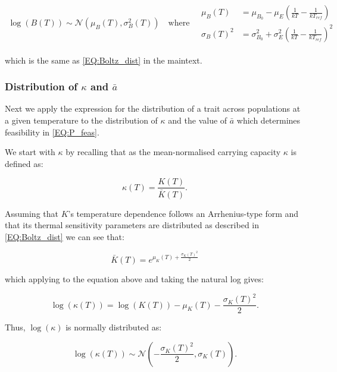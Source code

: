 \documentclass{article}
\begin{document}
\begin{align*} 
    \log(B(T)) \sim \mathcal{N}\left(\mu_{B}(T) , \sigma_{B}^2(T) \right) 
    \quad \text{where} \quad
    \begin{array}{cc}
        \mu_B(T) &= \mu_{B_0} - \mu_{E} \left(\frac{1}{kT} - \frac{1}{k T_{ref} }\right)  \\
        \sigma_{B}(T)^2 &= \sigma_{B_0}^2 + \sigma_{E}^2 \left(\frac{1}{kT} - \frac{1}{k T_{ref} }\right)^2
    \end{array}
\end{align*}

which is the same as \cref{EQ:Boltz_dist} in the maintext. 

\subsubsection*{Distribution of $\kappa$ and $\bar{a}$}

Next we apply the expression for the distribution of a trait across populations at a given temperature to the distribution of $\kappa$ and the value of $\bar{a}$ which determines feasibility in \cref{EQ:P_feas}. 

We start with $\kappa$ by recalling that as the mean-normalised carrying capacity $\kappa$ is defined as:

\begin{equation*}
    \kappa(T) = \frac{K(T)}{\bar{K}(T)}.
\end{equation*}

Assuming that $K$'s temperature dependence follows an Arrhenius-type form and that its thermal sensitivity parameters are distributed as described in \cref{EQ:Boltz_dist} we can see that:

\begin{equation*}
    \bar{K}(T) = e^{\mu_K(T) + \frac{\sigma_K(T)^2}{2}}
\end{equation*}

which applying to the equation above and taking the natural log gives:

\begin{equation*}
    \log(\kappa(T)) = \log(K(T)) - \mu_K(T) - \frac{\sigma_K(T)^2}{2}.
\end{equation*}

Thus, $\log(\kappa)$ is normally distributed as:

\begin{equation*}
    \log(\kappa(T)) \sim \mathcal{N}\left(-\frac{\sigma_K(T)^2}{2},\sigma_K(T)\right).
\end{equation*}
\end{document}
